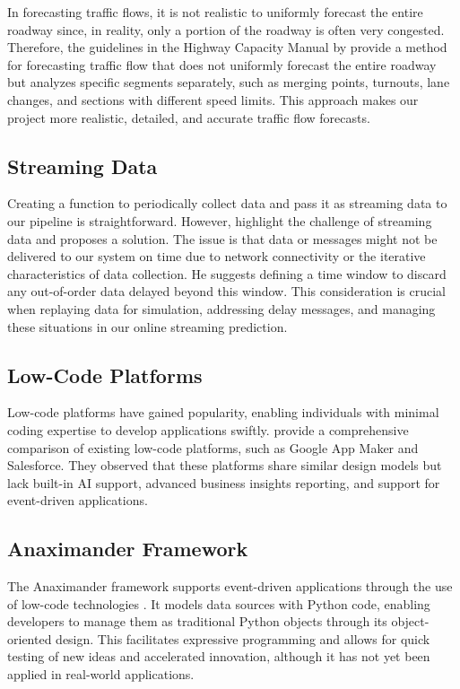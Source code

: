 \documentclass[12pt]{article}
\begin{document}
 In forecasting traffic flows, it is not realistic to uniformly forecast the entire roadway since, in reality, only a portion of the roadway is often very congested. Therefore, the guidelines in the Highway Capacity Manual by \citet{bob2023freeway} provide a method for forecasting traffic flow that does not uniformly forecast the entire roadway but analyzes specific segments separately, such as merging points, turnouts, lane changes, and sections with different speed limits. This approach makes our project more realistic, detailed, and accurate traffic flow forecasts.

\subsection{Streaming Data}
 Creating a function to periodically collect data and pass it as streaming data to our pipeline is straightforward. However, \citet{damji2020learning} highlight the challenge of streaming data and proposes a solution. The issue is that data or messages might not be delivered to our system on time due to network connectivity or the iterative characteristics of data collection. He suggests defining a time window to discard any out-of-order data delayed beyond this window. This consideration is crucial when replaying data for simulation, addressing delay messages, and managing these situations in our online streaming prediction.



\subsection{Low-Code Platforms}
 Low-code platforms have gained popularity, enabling individuals with minimal coding expertise to develop applications swiftly. \citet{sahay2020supporting} provide a comprehensive comparison of existing low-code platforms, such as Google App Maker and Salesforce. They observed that these platforms share similar design models but lack built-in AI support, advanced business insights reporting, and support for event-driven applications.

\subsection{Anaximander Framework}

 The Anaximander framework supports event-driven applications through the use of low-code technologies \autocite{jd2021anaximander}. It models data sources with Python code, enabling developers to manage them as traditional Python objects through its object-oriented design. This facilitates expressive programming and allows for quick testing of new ideas and accelerated innovation, although it has not yet been applied in real-world applications.
\end{document}
